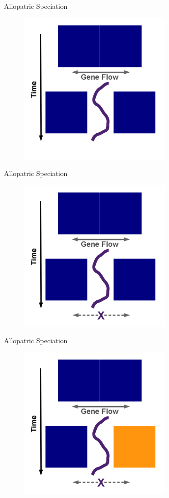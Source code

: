 \documentclass[t,10pt]{beamer}
\begin{document}
\begin{frame}[label={sec:orgheadline7}]{Allopatric Speciation}
\begin{figure}[htb]
\centering
\includegraphics[width=3in,height=3in]{./Figures/Allopatric_Speciation_Figure/png/4_Allopatric_Speciation.png}
\end{figure}
\end{frame}
\begin{frame}[label={sec:orgheadline8}]{Allopatric Speciation}
\begin{figure}[htb]
\centering
\includegraphics[width=3in,height=3in]{./Figures/Allopatric_Speciation_Figure/png/5_Allopatric_Speciation.png}
\end{figure}
\end{frame}
\begin{frame}[label={sec:orgheadline9}]{Allopatric Speciation}
\begin{figure}[htb]
\centering
\includegraphics[width=3in,height=3in]{./Figures/Allopatric_Speciation_Figure/png/6_Allopatric_Speciation.png}
\end{figure}
\end{frame}
\end{document}
